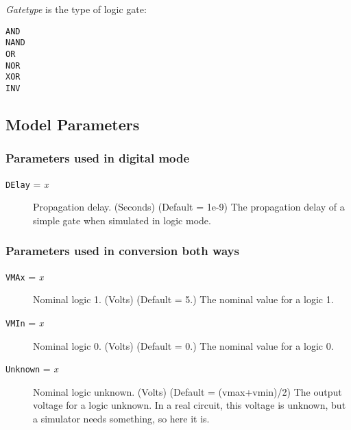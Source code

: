 {\em Gatetype} is the type of logic gate:

\begin{description}

\item[{\tt AND}]

\item[{\tt NAND}]

\item[{\tt OR}]

\item[{\tt NOR}]

\item[{\tt XOR}]

\item[{\tt INV}]

\end{description}
\subsection{Model Parameters}

\subsubsection{Parameters used in digital mode}
\begin{description}

\item[{\tt DElay} = {\it x}] Propagation delay.  (Seconds) (Default = 1e-9)
The propagation delay of a simple gate when simulated in logic mode.

\end{description}
\subsubsection{Parameters used in conversion both ways}
\begin{description}

\item[{\tt VMAx} = {\it x}] Nominal logic 1.  (Volts) (Default = 5.) The
nominal value for a logic 1.

\item[{\tt VMIn} = {\it x}] Nominal logic 0.  (Volts) (Default = 0.) The
nominal value for a logic 0.

\item[{\tt Unknown} = {\it x}] Nominal logic unknown.  (Volts) 
(Default = (vmax+vmin)/2) The output voltage for a logic unknown.  In
a real circuit, this voltage is unknown, but a simulator needs
something, so here it is.

\end{description}
